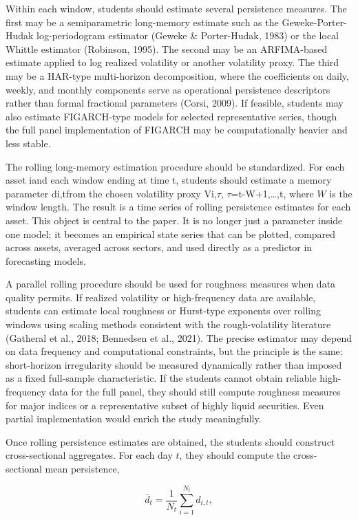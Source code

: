 \documentclass[12pt]{article}
\begin{document}
Within each window, students should estimate several persistence measures. The first may be a semiparametric long-memory estimate such as the Geweke-Porter-Hudak log-periodogram estimator (Geweke \& Porter-Hudak, 1983) or the local Whittle estimator (Robinson, 1995). The second may be an ARFIMA-based estimate applied to log realized volatility or another volatility proxy. The third may be a HAR-type multi-horizon decomposition, where the coefficients on daily, weekly, and monthly components serve as operational persistence descriptors rather than formal fractional parameters (Corsi, 2009). If feasible, students may also estimate FIGARCH-type models for selected representative series, though the full panel implementation of FIGARCH may be computationally heavier and less stable.

The rolling long-memory estimation procedure should be standardized. For each asset iand each window ending at time t, students should estimate a memory parameter di,tfrom the chosen volatility proxy Vi,$\tau$, $\tau$=t-W+1,\ldots,t, where $W$ is the window length. The result is a time series of rolling persistence estimates for each asset. This object is central to the paper. It is no longer just a parameter inside one model; it becomes an empirical state series that can be plotted, compared across assets, averaged across sectors, and used directly as a predictor in forecasting models.

A parallel rolling procedure should be used for roughness measures when data quality permits. If realized volatility or high-frequency data are available, students can estimate local roughness or Hurst-type exponents over rolling windows using scaling methods consistent with the rough-volatility literature (Gatheral et al., 2018; Bennedsen et al., 2021). The precise estimator may depend on data frequency and computational constraints, but the principle is the same: short-horizon irregularity should be measured dynamically rather than imposed as a fixed full-sample characteristic. If the students cannot obtain reliable high-frequency data for the full panel, they should still compute roughness measures for major indices or a representative subset of highly liquid securities. Even partial implementation would enrich the study meaningfully.

Once rolling persistence estimates are obtained, the students should construct cross-sectional aggregates. For each day $t$, they should compute the cross-sectional mean persistence,

\[\bar{d}_t = \frac{1}{N_t}\sum_{i=1}^{N_t} d_{i,t},\]
\end{document}
